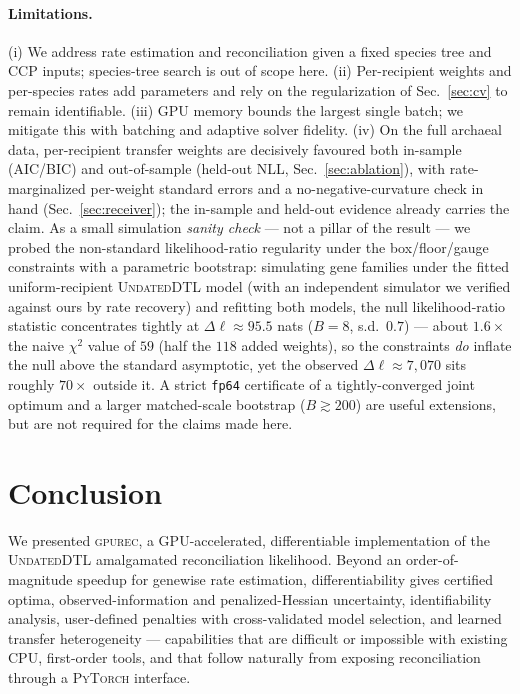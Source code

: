 \documentclass[11pt]{article}
\newcommand{\toolname}{\textsc{gpurec}\xspace}
\begin{document}
\paragraph{Limitations.} (i) We address rate estimation and reconciliation
given a fixed species tree and CCP inputs; species-tree search is out of scope
here. (ii) Per-recipient weights and per-species rates add parameters and rely
on the regularization of Sec.~\ref{sec:cv} to remain identifiable. (iii) GPU
memory bounds the largest single batch; we mitigate this with batching and
adaptive solver fidelity. (iv) On the full archaeal data, per-recipient transfer
weights are decisively favoured both in-sample (AIC/BIC) and out-of-sample (held-out
NLL, Sec.~\ref{sec:ablation}), with rate-marginalized per-weight standard errors and a
no-negative-curvature check in hand (Sec.~\ref{sec:receiver}); the in-sample and held-out
evidence already carries the claim. As a small simulation \emph{sanity check} --- not a
pillar of the result --- we probed the non-standard likelihood-ratio regularity under the
box/floor/gauge constraints with a parametric bootstrap: simulating gene families under
the fitted uniform-recipient \textsc{UndatedDTL} model (with an independent simulator we
verified against ours by rate recovery) and refitting both models, the null
likelihood-ratio statistic concentrates tightly at $\Delta\ell\!\approx\!95.5$ nats
($B{=}8$, s.d.\ $0.7$) --- about $1.6\times$ the naive $\chi^2$ value of $59$ (half the
$118$ added weights), so the constraints \emph{do} inflate the null above the standard
asymptotic, yet the observed $\Delta\ell\!\approx\!7{,}070$ sits roughly $70\times$ outside
it. A strict \texttt{fp64} certificate of a tightly-converged joint optimum and a larger
matched-scale bootstrap ($B\!\gtrsim\!200$) are useful extensions, but are not required for
the claims made here.

\section{Conclusion}
\label{sec:conclusion}
We presented \toolname, a GPU-accelerated, differentiable implementation of the
\textsc{UndatedDTL} amalgamated reconciliation likelihood. Beyond an
order-of-magnitude speedup for genewise rate estimation, differentiability
gives certified optima, observed-information and penalized-Hessian uncertainty,
identifiability analysis, user-defined penalties with cross-validated model
selection, and learned transfer heterogeneity --- capabilities that are
difficult or impossible with existing CPU, first-order tools, and that follow
naturally from exposing reconciliation through a \textsc{PyTorch} interface.
\end{document}
